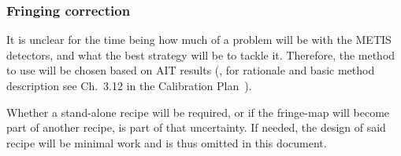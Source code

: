 \subsubsection{Fringing correction}
\label{rec:metis_fringing_correction}

It is unclear for the time being how much of a problem will be with the METIS
detectors, and what the best strategy will be to tackle it. Therefore, the
method to use will be chosen based on AIT results (, for rationale and basic method description see Ch.~3.12 in the Calibration Plan~\cite{METIS-calibration_plan}).

Whether a stand-alone recipe will be required, or if the fringe-map will become
part of another recipe, is part of that uncertainty. If needed, the design of
said recipe will be minimal work and is thus omitted in this document.

